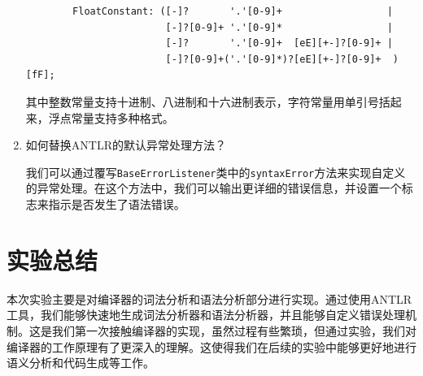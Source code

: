\documentclass[UTF8]{report}
\begin{document}
\begin{enumerate}
\begin{lstlisting}
        FloatConstant: ([-]?       '.'[0-9]+                  |
                        [-]?[0-9]+ '.'[0-9]*                  |
                        [-]?       '.'[0-9]+  [eE][+-]?[0-9]+ |
                        [-]?[0-9]+('.'[0-9]*)?[eE][+-]?[0-9]+  )[fF];
    \end{lstlisting}

    其中整数常量支持十进制、八进制和十六进制表示，字符常量用单引号括起来，浮点常量支持多种格式。
    

    \item 如何替换ANTLR的默认异常处理方法？
    
    我们可以通过覆写\texttt{BaseErrorListener}类中的\texttt{syntaxError}方法来实现自定义的异常处理。在这个方法中，我们可以输出更详细的错误信息，并设置一个标志来指示是否发生了语法错误。
\end{enumerate}

\section{实验总结}

本次实验主要是对编译器的词法分析和语法分析部分进行实现。通过使用ANTLR工具，我们能够快速地生成词法分析器和语法分析器，并且能够自定义错误处理机制。这是我们第一次接触编译器的实现，虽然过程有些繁琐，但通过实验，我们对编译器的工作原理有了更深入的理解。这使得我们在后续的实验中能够更好地进行语义分析和代码生成等工作。
\end{document}
